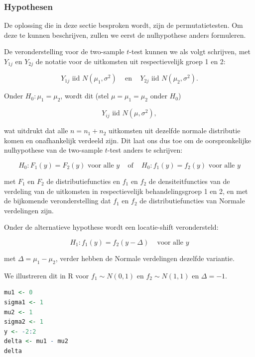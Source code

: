 \documentclass[
  12pt,dutch,coursenotes]{book}
\theoremstyle{definition}
\theoremstyle{definition}
\theoremstyle{definition}
\theoremstyle{definition}
\theoremstyle{remark}
\begin{document}
\hypertarget{hypothesen}{%
\subsubsection{Hypothesen}\label{hypothesen}}

De oplossing die in deze sectie besproken wordt, zijn de permutatietesten.
Om deze te kunnen beschrijven, zullen we eerst de nulhypothese anders formuleren.

De veronderstelling voor de two-sample \(t\)-test kunnen we als volgt schrijven, met \(Y_{1j}\) en \(Y_{2j}\) de notatie voor de uitkomsten uit respectievelijk groep 1 en 2:

\[Y_{1j} \text{ iid } N(\mu_1,\sigma^2) \;\;\;\text{ en }\;\;\; Y_{2j} \text{ iid } N(\mu_2,\sigma^2).\]

Onder \(H_0:\mu_1=\mu_2\), wordt dit (stel \(\mu=\mu_1=\mu_2\) onder \(H_0\))

\[ Y_{ij} \text{ iid } N(\mu,\sigma^2),\]

wat uitdrukt dat alle \(n=n_1+n_2\) uitkomsten uit dezelfde normale distributie komen en onafhankelijk verdeeld zijn. Dit laat ons dus toe om de oorspronkelijke nulhypothese van de two-sample \(t\)-test anders te schrijven:

\begin{equation}
H_0: F_1(y) = F_2(y) \text{ voor alle } y \;\;\;\text{ of }\;\;\; H_0: f_1(y) = f_2(y) \text{ voor alle } y \label{eq:H0F1F2}
\end{equation}

met \(F_1\) en \(F_2\) de distributiefuncties en \(f_1\) en \(f_2\) de densiteitfuncties van de verdeling van de uitkomsten in respectievelijk behandelingsgroep 1 en 2, en met de bijkomende veronderstelling dat \(f_1\) en \(f_2\) de distributiefuncties van Normale verdelingen zijn.

Onder de alternatieve hypothese wordt een locatie-shift verondersteld:

\[H_1: f_1(y)=f_2(y-\Delta) \;\;\;\text{ voor alle } y\]

met \(\Delta=\mu_1-\mu_2\), verder hebben de Normale verdelingen dezelfde variantie.

We illustreren dit in R voor \(f_1\sim N(0,1)\) en \(f_2\sim N(1,1)\) en \(\Delta=-1\).

\begin{lstlisting}[language=R]
mu1 <- 0
sigma1 <- 1
mu2 <- 1
sigma2 <- 1
y <- -2:2
delta <- mu1 - mu2
delta
\end{lstlisting}
\end{document}
